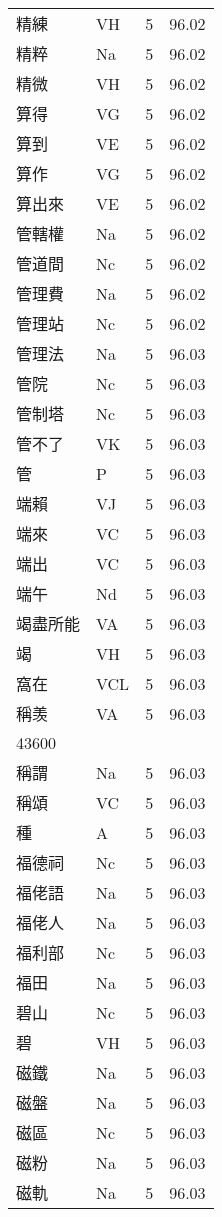 \documentclass[twocolumn]{book}
\begin{document}
\begin{supertabular}{llrr}
精練 & VH & 5 &  96.02\\
精粹 & Na & 5 &  96.02\\
精微 & VH & 5 &  96.02\\
算得 & VG & 5 &  96.02\\
算到 & VE & 5 &  96.02\\
算作 & VG & 5 &  96.02\\
算出來 & VE & 5 &  96.02\\
管轄權 & Na & 5 &  96.02\\
管道間 & Nc & 5 &  96.02\\
管理費 & Na & 5 &  96.02\\
管理站 & Nc & 5 &  96.02\\
管理法 & Na & 5 &  96.03\\
管院 & Nc & 5 &  96.03\\
管制塔 & Nc & 5 &  96.03\\
管不了 & VK & 5 &  96.03\\
管 & P & 5 &  96.03\\
端賴 & VJ & 5 &  96.03\\
端來 & VC & 5 &  96.03\\
端出 & VC & 5 &  96.03\\
端午 & Nd & 5 &  96.03\\
竭盡所能 & VA & 5 &  96.03\\
竭 & VH & 5 &  96.03\\
窩在 & VCL & 5 &  96.03\\
稱羡 & VA & 5 &  96.03\\
43600\\
稱謂 & Na & 5 &  96.03\\
稱頌 & VC & 5 &  96.03\\
種 & A & 5 &  96.03\\
福德祠 & Nc & 5 &  96.03\\
福佬語 & Na & 5 &  96.03\\
福佬人 & Na & 5 &  96.03\\
福利部 & Nc & 5 &  96.03\\
福田 & Na & 5 &  96.03\\
碧山 & Nc & 5 &  96.03\\
碧 & VH & 5 &  96.03\\
磁鐵 & Na & 5 &  96.03\\
磁盤 & Na & 5 &  96.03\\
磁區 & Nc & 5 &  96.03\\
磁粉 & Na & 5 &  96.03\\
磁軌 & Na & 5 &  96.03\\

\end{supertabular}
\end{document}
